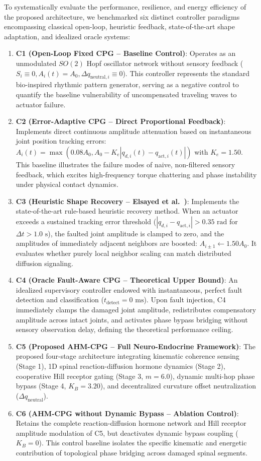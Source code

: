 \documentclass{iopjournal}
\begin{document}
To systematically evaluate the performance, resilience, and energy efficiency of the proposed architecture, we benchmarked six distinct controller paradigms encompassing classical open-loop, heuristic feedback, state-of-the-art shape adaptation, and idealized oracle systems:
\begin{enumerate}
\item \textbf{C1 (Open-Loop Fixed CPG -- Baseline Control)}: Operates as an unmodulated $SO(2)$ Hopf oscillator network without sensory feedback ($S_i \equiv 0, A_i(t) = A_0, \Delta q_{\text{neutral},i} \equiv 0$). This controller represents the standard bio-inspired rhythmic pattern generator, serving as a negative control to quantify the baseline vulnerability of uncompensated traveling waves to actuator failure.
\item \textbf{C2 (Error-Adaptive CPG -- Direct Proportional Feedback)}: Implements direct continuous amplitude attenuation based on instantaneous joint position tracking errors: $A_i(t) = \max(0.08 A_0, A_0 - K_e |q_{d,i}(t) - q_{\text{act},i}(t)|)$ with $K_e = 1.50$. This baseline illustrates the failure modes of naive, non-filtered sensory feedback, which excites high-frequency torque chattering and phase instability under physical contact dynamics.
\item \textbf{C3 (Heuristic Shape Recovery -- Elsayed et al.~\cite{elsayed2021})}: Implements the state-of-the-art rule-based heuristic recovery method. When an actuator exceeds a sustained tracking error threshold ($|q_{d,i} - q_{\text{act},i}| > 0.35\text{ rad}$ for $\Delta t > 1.0\text{ s}$), the faulted joint amplitude is clamped to zero, and the amplitudes of immediately adjacent neighbors are boosted: $A_{i\pm 1} \leftarrow 1.50 A_0$. It evaluates whether purely local neighbor scaling can match distributed diffusion signaling.
\item \textbf{C4 (Oracle Fault-Aware CPG -- Theoretical Upper Bound)}: An idealized supervisory controller endowed with instantaneous, perfect fault detection and classification ($t_{\text{detect}} = 0\text{ ms}$). Upon fault injection, C4 immediately clamps the damaged joint amplitude, redistributes compensatory amplitude across intact joints, and activates phase bypass bridging without sensory observation delay, defining the theoretical performance ceiling.
\item \textbf{C5 (Proposed AHM-CPG -- Full Neuro-Endocrine Framework)}: The proposed four-stage architecture integrating kinematic coherence sensing (Stage 1), 1D spinal reaction-diffusion hormone dynamics (Stage 2), cooperative Hill receptor gating (Stage 3, $m=6.0$), dynamic multi-hop phase bypass (Stage 4, $K_B = 3.20$), and decentralized curvature offset neutralization ($\Delta q_{\text{neutral}}$).
\item \textbf{C6 (AHM-CPG without Dynamic Bypass -- Ablation Control)}: Retains the complete reaction-diffusion hormone network and Hill receptor amplitude modulation of C5, but deactivates dynamic bypass coupling ($K_B = 0$). This control baseline isolates the specific kinematic and energetic contribution of topological phase bridging across damaged spinal segments.
\end{enumerate}
\end{document}
